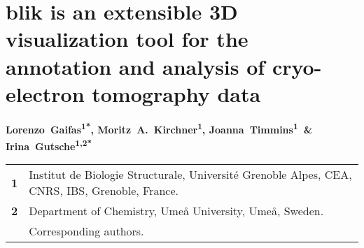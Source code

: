 \section*{blik is an extensible 3D visualization tool for the annotation and analysis of cryo-electron tomography data} %

{\setlength{\parindent}{0cm} \bfseries
Lorenzo~Gaifas\textsuperscript{1*},
Moritz~A.~Kirchner\textsuperscript{1},
Joanna~Timmins\textsuperscript{1}~\&
Irina~Gutsche\textsuperscript{1,2*}
}

\begin{singlespace}
\begin{scriptsize}
\raggedright
\begin{tabularx}{\linewidth}{>{\bfseries}l X}
1 & Institut de Biologie Structurale, Université Grenoble Alpes, CEA, CNRS, IBS, Grenoble, France. \\
2 & Department of Chemistry, Umeå University, Umeå, Sweden. \\
* & Corresponding authors. \\
\end{tabularx}
\end{scriptsize}
\end{singlespace}

